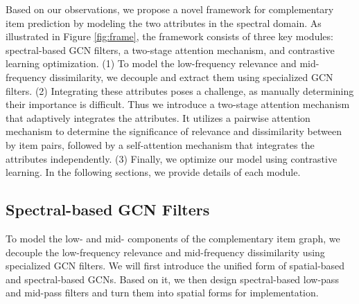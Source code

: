 \documentclass[letterpaper]{article} %
\begin{document}
\label{sec:overview}
Based on our observations, we propose a novel framework for complementary item prediction by modeling the two attributes in the spectral domain. As illustrated in Figure \ref{fig:frame}, the framework consists of three key modules: spectral-based GCN filters, a two-stage attention mechanism, and contrastive learning optimization. (1) To model the low-frequency relevance and mid-frequency dissimilarity, we decouple and extract them using specialized GCN filters. (2) Integrating these attributes poses a challenge, as manually determining their importance is difficult. Thus we introduce a two-stage attention mechanism that adaptively integrates the attributes. It utilizes a pairwise attention mechanism to determine the significance of relevance and dissimilarity between by item pairs, followed by a self-attention mechanism that integrates the attributes independently. (3) Finally, we optimize our model using contrastive learning. In the following sections, we provide details of each module.

\subsection{Spectral-based GCN Filters}
\label{sec:filter}
To model the low- and mid- components of the complementary item graph, we decouple the low-frequency relevance and mid-frequency dissimilarity using specialized GCN filters. We will first introduce the unified form of spatial-based and spectral-based GCNs. Based on it, we then design spectral-based low-pass and mid-pass filters and turn them into spatial forms for implementation.
\end{document}
